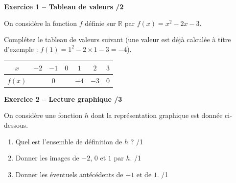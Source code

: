 \documentclass[10pt,a4paper]{article}
\begin{document}


\textbf{Exercice 1 -- Tableau de valeurs \hfill /2}

On considère la fonction \(f\) définie sur \(\mathbb{R}\) par \(f(x)=x^2-2x-3\).

Complétez le tableau de valeurs suivant (une valeur est déjà calculée à titre d'exemple : \(f(1)=1^2-2\times 1-3=-4\)).

\begin{center}
    \renewcommand{\arraystretch}{1.5}
    \setlength{\tabcolsep}{0.25cm}
    \begin{tabular}{|*{7}{c|}}
    \hline
    \(x\) & \(-2\) & \(-1\) & \(0\) & \(1\) & \(2\) & \(3\) \\
    \hline
    \(f(x)\) & & \(0\) & & \(-4\) & \(-3\) & \(0\) \\
    \hline
    \end{tabular}
\end{center}

\vspace{3cm}

\textbf{Exercice 2 -- Lecture graphique \hfill /3}

On considère une fonction \(h\) dont la représentation graphique est donnée ci-dessous.

\begin{center}
\end{center}

\begin{enumerate}
    \item Quel est l'ensemble de définition de \(h\) ? \hfill /1
    \item Donner les images de \(-2\), \(0\) et \(1\) par \(h\). \hfill /1
    \item Donner les éventuels antécédents de \(-1\) et de \(1\). \hfill /1
\end{enumerate}
\end{document}
